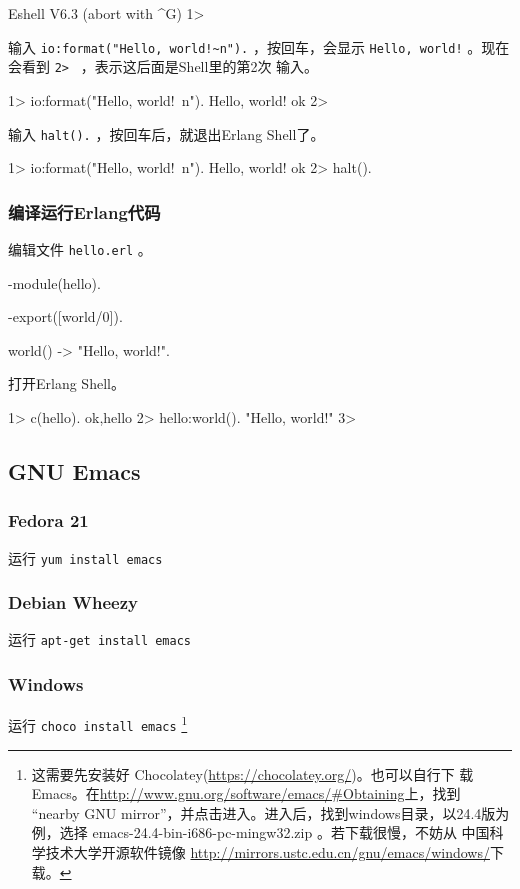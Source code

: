 \documentclass[preview,multi,crop=false,border=1in,class=memoir]{standalone}
\begin{document}
\begin{preview-page}
\begin{Listing}
Eshell V6.3  (abort with ^G)
1>
\end{Listing}

输入 \verb|io:format("Hello, world!~n").| ，按回车，会显示
\verb|Hello, world!| 。现在会看到 \verb|2> | ，表示这后面是Shell里的第2次
输入。

\begin{ErlangShellSession}
1> io:format("Hello, world!~n").
Hello, world!
ok
2>
\end{ErlangShellSession}

输入 \verb|halt().| ，按回车后，就退出Erlang Shell了。

\begin{Listing}
1> io:format("Hello, world!~n").
Hello, world!
ok
2> halt().
\end{Listing}

\subsubsection{编译运行Erlang代码}

编辑文件 \verb|hello.erl| 。

\begin{SourceCode}
-module(hello).

-export([world/0]).

world() -> "Hello, world!".
\end{SourceCode}

打开Erlang Shell。

\begin{ErlangShellSession}
1> c(hello).
{ok,hello}
2> hello:world().
"Hello, world!"
3>
\end{ErlangShellSession}

\subsection{GNU Emacs}

\subsubsection{Fedora 21}
运行 \verb|yum install emacs|

\subsubsection{Debian Wheezy}
运行 \verb|apt-get install emacs|

\subsubsection{Windows}
运行 \verb|choco install emacs|
\footnote{
这需要先安装好 Chocolatey(\url{https://chocolatey.org/})。也可以自行下
载Emacs。在\url{http://www.gnu.org/software/emacs/\#Obtaining}上，找到
``nearby GNU mirror''，并点击进入。进入后，找到windows目录，以24.4版为
例，选择 emacs-24.4-bin-i686-pc-mingw32.zip 。若下载很慢，不妨从
中国科学技术大学开源软件镜像
\url{http://mirrors.ustc.edu.cn/gnu/emacs/windows/}下载。
}


\end{preview-page}
\end{document}
